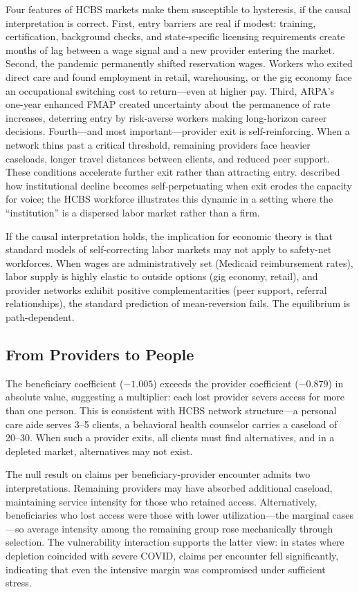 \documentclass[12pt]{article}
\begin{document}
Four features of HCBS markets make them susceptible to hysteresis, if the causal interpretation is correct. First, entry barriers are real if modest: training, certification, background checks, and state-specific licensing requirements create months of lag between a wage signal and a new provider entering the market. Second, the pandemic permanently shifted reservation wages. Workers who exited direct care and found employment in retail, warehousing, or the gig economy face an occupational switching cost to return---even at higher pay. Third, ARPA's one-year enhanced FMAP created uncertainty about the permanence of rate increases, deterring entry by risk-averse workers making long-horizon career decisions. Fourth---and most important---provider exit is self-reinforcing. When a network thins past a critical threshold, remaining providers face heavier caseloads, longer travel distances between clients, and reduced peer support. These conditions accelerate further exit rather than attracting entry. \citet{hirschman1970} described how institutional decline becomes self-perpetuating when exit erodes the capacity for voice; the HCBS workforce illustrates this dynamic in a setting where the ``institution'' is a dispersed labor market rather than a firm.

If the causal interpretation holds, the implication for economic theory is that standard models of self-correcting labor markets may not apply to safety-net workforces. When wages are administratively set (Medicaid reimbursement rates), labor supply is highly elastic to outside options (gig economy, retail), and provider networks exhibit positive complementarities (peer support, referral relationships), the standard prediction of mean-reversion fails. The equilibrium is path-dependent.

\subsection{From Providers to People}

The beneficiary coefficient ($-1.005$) exceeds the provider coefficient ($-0.879$) in absolute value, suggesting a multiplier: each lost provider severs access for more than one person. This is consistent with HCBS network structure---a personal care aide serves 3--5 clients, a behavioral health counselor carries a caseload of 20--30. When such a provider exits, all clients must find alternatives, and in a depleted market, alternatives may not exist.

The null result on claims per beneficiary-provider encounter admits two interpretations. Remaining providers may have absorbed additional caseload, maintaining service intensity for those who retained access. Alternatively, beneficiaries who lost access were those with lower utilization---the marginal cases---so average intensity among the remaining group rose mechanically through selection. The vulnerability interaction supports the latter view: in states where depletion coincided with severe COVID, claims per encounter fell significantly, indicating that even the intensive margin was compromised under sufficient stress.
\end{document}
